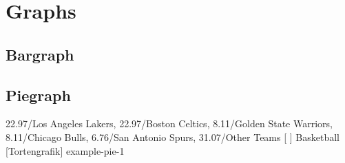\chapter{Graphs}\label{ch:graphs}

\section{Bargraph}\label{sec:graphs-bar}

\section{Piegraph}\label{sec:graphs-pie}
\easyPie
{
    22.97/Los Angeles Lakers,
    22.97/Boston Celtics,
    8.11/Golden State Warriors,
    8.11/Chicago Bulls,
    6.76/San Antonio Spurs,
    31.07/Other Teams
}
[
]
{Basketball}
[Tortengrafik]
{example-pie-1}